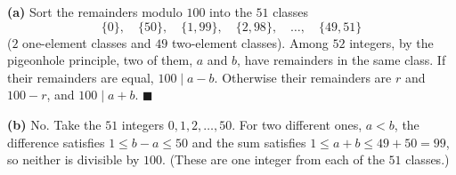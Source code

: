 \textbf{(a)} Sort the remainders modulo $100$ into the $51$ classes
\[\{0\},\quad\{50\},\quad\{1,99\},\quad\{2,98\},\quad\dots,\quad\{49,51\}\]
($2$ one-element classes and $49$ two-element classes). Among $52$ integers, by the pigeonhole principle, two of them, $a$ and $b$, have remainders in the same class. If their remainders are equal, $100\mid a-b$. Otherwise their remainders are $r$ and $100-r$, and $100\mid a+b$. $\blacksquare$

\textbf{(b)} $\boxed{\text{No}}$. Take the $51$ integers $0,1,2,\dots,50$. For two different ones, $a<b$, the difference satisfies $1\le b-a\le50$ and the sum satisfies $1\le a+b\le49+50=99$, so neither is divisible by $100$. (These are one integer from each of the $51$ classes.)
